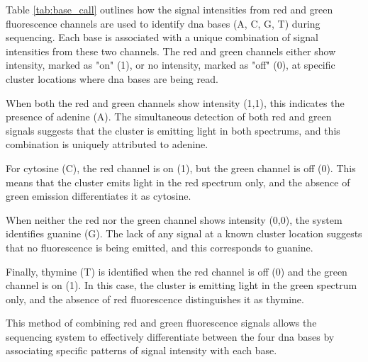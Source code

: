 Table \ref{tab:base_call} outlines how the signal intensities from red and green fluorescence channels are used to identify \ac{dna} bases (A, C, G, T) during sequencing. Each base is associated with a unique combination of signal intensities from these two channels. The red and green channels either show intensity, marked as "on" (1), or no intensity, marked as "off" (0), at specific cluster locations where \ac{dna} bases are being read.

When both the red and green channels show intensity (1,1), this indicates the presence of adenine (A). The simultaneous detection of both red and green signals suggests that the cluster is emitting light in both spectrums, and this combination is uniquely attributed to adenine.

For cytosine (C), the red channel is on (1), but the green channel is off (0). This means that the cluster emits light in the red spectrum only, and the absence of green emission differentiates it as cytosine.

When neither the red nor the green channel shows intensity (0,0), the system identifies guanine (G). The lack of any signal at a known cluster location suggests that no fluorescence is being emitted, and this corresponds to guanine.

Finally, thymine (T) is identified when the red channel is off (0) and the green channel is on (1). In this case, the cluster is emitting light in the green spectrum only, and the absence of red fluorescence distinguishes it as thymine.

This method of combining red and green fluorescence signals allows the sequencing system to effectively differentiate between the four \ac{dna} bases by associating specific patterns of signal intensity with each base.

\begin{table}[H]
    \centering
    \caption{Base Calls in 2-Channel Sequencing (NovaSeq 6000 - Illumina). Table from \cite{NovaSeq}}
    \label{tab:base_call}
\end{table}


